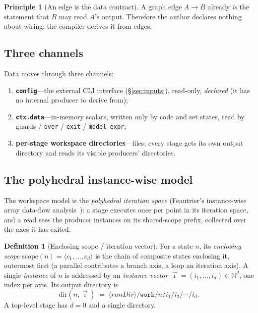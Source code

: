 \documentclass[11pt]{article}
\theoremstyle{plain}
\theoremstyle{definition}
\newtheorem{definition}[theorem]{Definition}
\newtheorem{principle}[theorem]{Principle}
\theoremstyle{remark}
\newcommand{\code}[1]{\texttt{#1}}
\newcommand{\state}[1]{\textsf{#1}}
\newcommand{\Nat}{\mathbb{N}}
\begin{document}
\begin{principle}[An edge is the data contract]\label{prin:edge}
A graph edge $A \to B$ already \emph{is} the statement that $B$ may read $A$'s
output. Therefore the author declares nothing about wiring; the compiler derives it
from edges.
\end{principle}

\subsection{Three channels}

Data moves through three channels:
\begin{enumerate}[nosep]
  \item \textbf{\code{config}}---the external CLI interface (\S\ref{sec:inputs}),
        read-only, \emph{declared} (it has no internal producer to derive from);
  \item \textbf{\code{ctx.data}}---in-memory scalars, written only by \state{code}
        and \state{set} states, read by guards / \code{over} / \code{exit} /
        \code{model-expr};
  \item \textbf{per-stage workspace directories}---files; every stage gets its own
        output directory and reads its visible producers' directories.
\end{enumerate}

\subsection{The polyhedral instance-wise model}

The workspace model is the \emph{polyhedral iteration space} (Feautrier's
instance-wise array data-flow analysis~\cite{feautrier}): a stage executes once per point in its
iteration space, and a read sees the producer instances on its shared-scope prefix,
collected over the axes it has exited.

\begin{definition}[Enclosing scope / iteration vector]\label{def:scope}
For a state $n$, its \emph{enclosing scope} $\mathrm{scope}(n) = \langle c_1,
\dots, c_d \rangle$ is the chain of composite states enclosing it, outermost first
(a \state{parallel} contributes a branch axis, a \state{loop} an iteration axis).
A single \emph{instance} of $n$ is addressed by an \emph{instance vector}
$\vec{\imath} = (i_1, \dots, i_d) \in \Nat^d$, one index per axis. Its output
directory is
\[
  \mathrm{dir}(n, \vec{\imath}) \;=\; \langle\mathit{runDir}\rangle/\code{work}/n/i_1/i_2/\cdots/i_d .
\]
A top-level stage has $d = 0$ and a single directory.
\end{definition}
\end{document}
